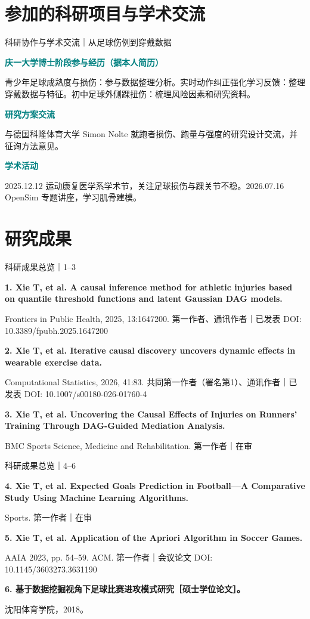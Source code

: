 \documentclass[handout,defaultFootings,slideTotalNumber,ENlocalization,lightTitle,hideSidebar,classicFont]{mul-beamer}
\newcommand{\credit}[1]{\par\vspace{2pt}{\scriptsize\color{ink!75}#1}\par}
\newcommand{\point}[2]{\par\textcolor{teal}{\textbf{#1}}\par #2\par\vspace{3pt}}
\begin{document}
\section{参加的科研项目与学术交流}

\begin{frame}{科研协作与学术交流｜从足球伤例到穿戴数据}
\small
\point{庆一大学博士阶段参与经历（据本人简历）}{青少年足球成熟度与损伤：参与数据整理分析。实时动作纠正强化学习反馈：整理穿戴数据与特征。初中足球外侧踝扭伤：梳理风险因素和研究资料。}
\point{研究方案交流}{与德国科隆体育大学 Simon Nolte 就跑者损伤、跑量与强度的研究设计交流，并征询方法意见。}
\point{学术活动}{2025.12.12 运动康复医学系学术节，关注足球损伤与踝关节不稳。2026.07.16 OpenSim 专题讲座，学习肌骨建模。}
\credit{身份与分工按简历中的参与、交流、参会记录列示。}
\end{frame}


\section{研究成果}

\begin{frame}{科研成果总览｜1–3}
\small\raggedright
{\color{teal}\bfseries 1. Xie T, et al. A causal inference method for athletic injuries based on quantile threshold functions and latent Gaussian DAG models.}\par
Frontiers in Public Health, 2025, 13:1647200. 第一作者、通讯作者｜已发表 DOI: 10.3389/fpubh.2025.1647200\par\medskip
{\color{teal}\bfseries 2. Xie T, et al. Iterative causal discovery uncovers dynamic effects in wearable exercise data.}\par
Computational Statistics, 2026, 41:83. 共同第一作者（署名第1）、通讯作者｜已发表 DOI: 10.1007/s00180-026-01760-4\par\medskip
{\color{teal}\bfseries 3. Xie T, et al. Uncovering the Causal Effects of Injuries on Runners’ Training Through DAG-Guided Mediation Analysis.}\par
BMC Sports Science, Medicine and Rehabilitation. 第一作者｜在审\par\medskip
\end{frame}
\begin{frame}{科研成果总览｜4–6}
\small\raggedright
{\color{teal}\bfseries 4. Xie T, et al. Expected Goals Prediction in Football—A Comparative Study Using Machine Learning Algorithms.}\par
Sports. 第一作者｜在审\par\medskip
{\color{teal}\bfseries 5. Xie T, et al. Application of the Apriori Algorithm in Soccer Games.}\par
AAIA 2023, pp. 54–59. ACM. 第一作者｜会议论文 DOI: 10.1145/3603273.3631190\par\medskip
{\color{teal}\bfseries 6. 基于数据挖掘视角下足球比赛进攻模式研究［硕士学位论文］。}\par
沈阳体育学院，2018。\par\medskip
\end{frame}
\end{document}
